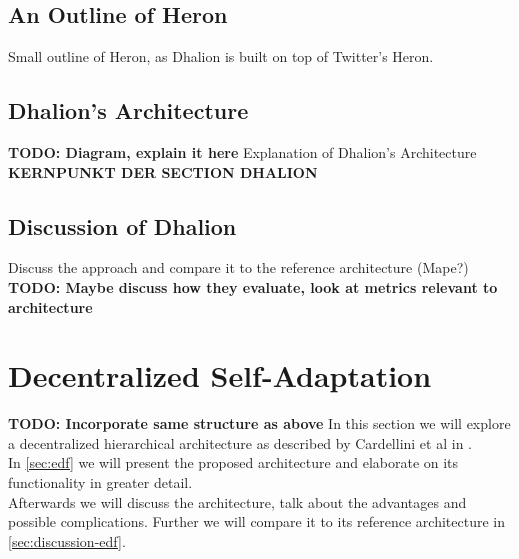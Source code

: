         \subsection{An Outline of Heron}
        \label{sub:heron-outline}
        Small outline of Heron, as Dhalion is built on top of Twitter's Heron.

        \subsection{Dhalion's Architecture}
        \label{sec:dhalion-architecture}
        \textbf{TODO: Diagram, explain it here}
        Explanation of Dhalion's Architecture \textbf{KERNPUNKT DER SECTION DHALION}

        \subsection{Discussion of Dhalion}
        \label{sec:dhalion-discussion}
        Discuss the approach and compare it to the reference architecture (Mape?)
        \textbf{TODO: Maybe discuss how they evaluate, look at metrics relevant to architecture}

    \section{Decentralized Self-Adaptation}
    \label{sec:hierarchical}
    \textbf{TODO: Incorporate same structure as above}
    In this section we will explore a decentralized hierarchical architecture as described by Cardellini et al in \cite{cardellini}.
    \\
    In \ref{sec:edf} we will present the proposed architecture and elaborate on its functionality in greater detail.
    \\
    Afterwards we will discuss the architecture, talk about the advantages and possible complications. Further we will compare it to its reference architecture in \ref{sec:discussion-edf}.



